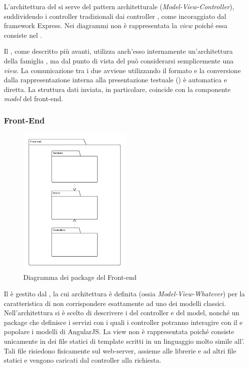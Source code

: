 L'architettura del  si serve del pattern architetturale  (\textit{Model-View-Controller}), suddividendo i controller tradizionali dai controller , come incoraggiato dal framework Express. Nei diagrammi non è rappresentata la \textit{view} poiché essa consiste nel .

Il , come descritto più avanti, utilizza anch'esso internamente un'architettura della famiglia , ma dal punto di vista del  può considerarsi semplicemente una \textit{view}. La comunicazione tra i due avviene utilizzando il formato  e la conversione dalla rappresentazione interna alla presentazione testuale () è automatica e diretta. La struttura dati inviata, in particolare, coincide con la componente \textit{model} del front-end.

\subsubsection{Front-End}

\begin{figure}[H]
\centering
\includegraphics[width=0.5\textwidth]{uml/package/Front-end.png}
\caption{Diagramma dei package del Front-end}
\end{figure}

Il  è gestito dal  , la cui architettura è definita  (ossia \textit{Model-View-Whatever}) per la caratteristica di non corrispondere esattamente ad uno dei modelli classici. Nell'architettura si è scelto di descrivere i  del controller e del model, nonché un package che definisce i servizi con i quali i controller potranno interagire con il  e popolare i modelli di AngularJS. La view non è rappresentata poiché consiste unicamente in dei file statici di template scritti in un linguaggio molto simile all'. Tali file risiedono fisicamente sul web-server, assieme alle librerie  e ad altri file statici e vengono caricati dal controller alla richiesta. 
